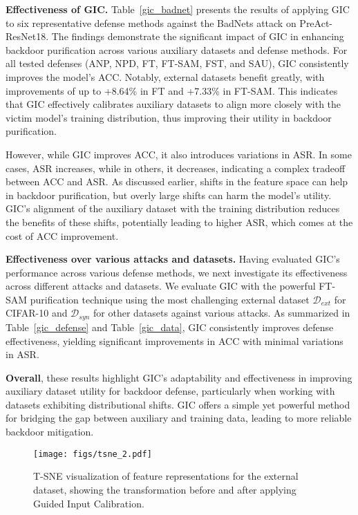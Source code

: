 
\textbf{Effectiveness of GIC.} Table~\ref{gic_badnet} presents the results of applying GIC to six representative defense methods against the BadNets attack on PreAct-ResNet18. The findings demonstrate the significant impact of GIC in enhancing backdoor purification across various auxiliary datasets and defense methods. For all tested defenses (ANP, NPD, FT, FT-SAM, FST, and SAU), GIC consistently improves the model's ACC. Notably, external datasets benefit greatly, with improvements of up to +8.64\% in FT and +7.33\% in FT-SAM. This indicates that GIC effectively calibrates auxiliary datasets to align more closely with the victim model's training distribution, thus improving their utility in backdoor purification.

However, while GIC improves ACC, it also introduces variations in ASR. In some cases, ASR increases, while in others, it decreases, indicating a complex tradeoff between ACC and ASR. As discussed earlier, shifts in the feature space can help in backdoor purification, but overly large shifts can harm the model’s utility. GIC's alignment of the auxiliary dataset with the training distribution reduces the benefits of these shifts, potentially leading to higher ASR, which comes at the cost of ACC improvement.






\textbf{Effectiveness over various attacks and datasets.} 
Having evaluated GIC’s performance across various defense methods, we next investigate its effectiveness across different attacks and datasets. We evaluate GIC with the powerful FT-SAM purification technique using the most challenging external dataset $\mathcal{D}_{ext}$ for CIFAR-10 and $\mathcal{D}_{syn}$ for other datasets against various attacks. As summarized in Table~\ref{gic_defense} and Table~\ref{gic_data}, GIC consistently improves defense effectiveness, yielding significant improvements in ACC with minimal variations in ASR.

\textbf{Overall}, these results highlight GIC's adaptability and effectiveness in improving auxiliary dataset utility for backdoor defense, particularly when working with datasets exhibiting distributional shifts. GIC offers a simple yet powerful method for bridging the gap between auxiliary and training data, leading to more reliable backdoor mitigation.
\begin{figure}[h]
    \centering
    \texttt{[image: figs/tsne\_2.pdf]}
    \caption{T-SNE visualization of feature representations for the external dataset, showing the transformation before and after applying Guided Input Calibration.}
    \label{tsnep2}
\end{figure}

